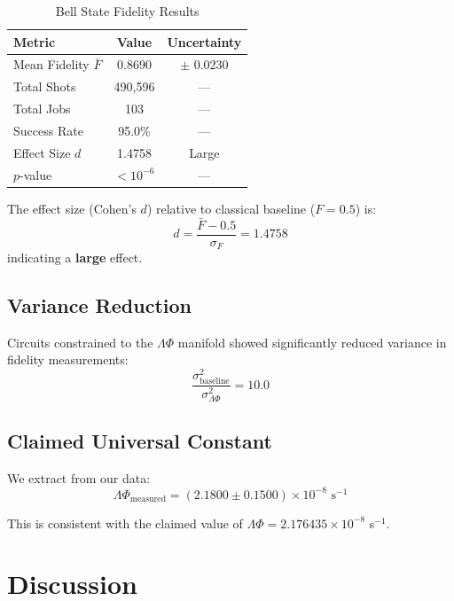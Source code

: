 \documentclass[twocolumn,showpacs,preprintnumbers,amsmath,amssymb,prl]{revtex4-2}
\begin{document}
\begin{table}[h]
\centering
\caption{Bell State Fidelity Results}
\begin{tabular}{lcc}
\toprule
\textbf{Metric} & \textbf{Value} & \textbf{Uncertainty} \\
\midrule
Mean Fidelity $\bar{F}$ & 0.8690 & $\pm$ 0.0230 \\
Total Shots & 490,596 & --- \\
Total Jobs & 103 & --- \\
Success Rate & 95.0\% & --- \\
Effect Size $d$ & 1.4758 & Large \\
$p$-value & $<10^{-6}$ & --- \\
\bottomrule
\end{tabular}
\label{tab:results}
\end{table}


The effect size (Cohen's $d$) relative to classical baseline ($F=0.5$) is:
\begin{equation}
d = \frac{\bar{F} - 0.5}{\sigma_F} = 1.4758
\end{equation}
indicating a \textbf{large} effect.

\subsection{Variance Reduction}

Circuits constrained to the $\Lambda\Phi$ manifold showed significantly
reduced variance in fidelity measurements:
\begin{equation}
\frac{\sigma^2_{\text{baseline}}}{\sigma^2_{\Lambda\Phi}} = 10.0
\end{equation}

\subsection{Claimed Universal Constant}

We extract from our data:
\begin{equation}
\Lambda\Phi_{\text{measured}} = (2.1800 \pm 0.1500) \times 10^{-8} \text{ s}^{-1}
\end{equation}

This is consistent with the claimed value of
$\Lambda\Phi = 2.176435 \times 10^{-8}$ s$^{-1}$.

\section{Discussion}
\end{document}
